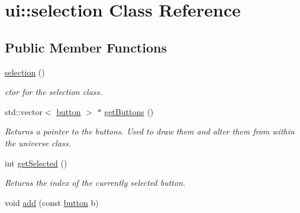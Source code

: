 \hypertarget{classui_1_1selection}{\section{ui\-:\-:selection Class Reference}
\label{classui_1_1selection}
}
\subsection*{Public Member Functions}
\begin{DoxyCompactItemize}
\item 
\hypertarget{classui_1_1selection_a738dc36d00684bfa3546afaa7e15a1fe}{\hyperlink{classui_1_1selection_a738dc36d00684bfa3546afaa7e15a1fe}{selection} ()}\label{classui_1_1selection_a738dc36d00684bfa3546afaa7e15a1fe}

\begin{DoxyCompactList}\small\item\em ctor for the selection class. \end{DoxyCompactList}\item 
\hypertarget{classui_1_1selection_acb0698da739939001d4c4c38b2097422}{std\-::vector$<$ \hyperlink{classui_1_1button}{button} $>$ $\ast$ \hyperlink{classui_1_1selection_acb0698da739939001d4c4c38b2097422}{get\-Buttons} ()}\label{classui_1_1selection_acb0698da739939001d4c4c38b2097422}

\begin{DoxyCompactList}\small\item\em Returns a pointer to the buttons. Used to draw them and alter them from within the universe class. \end{DoxyCompactList}\item 
\hypertarget{classui_1_1selection_af5d17f3015927ba212c13e30c525638d}{int \hyperlink{classui_1_1selection_af5d17f3015927ba212c13e30c525638d}{get\-Selected} ()}\label{classui_1_1selection_af5d17f3015927ba212c13e30c525638d}

\begin{DoxyCompactList}\small\item\em Returns the index of the currently selected button. \end{DoxyCompactList}\item 
\hypertarget{classui_1_1selection_a89ae0261dbc75bed20e4749e63530b4a}{void \hyperlink{classui_1_1selection_a89ae0261dbc75bed20e4749e63530b4a}{add} (const \hyperlink{classui_1_1button}{button} b)}\label{classui_1_1selection_a89ae0261dbc75bed20e4749e63530b4a}


\end{DoxyCompactItemize}
